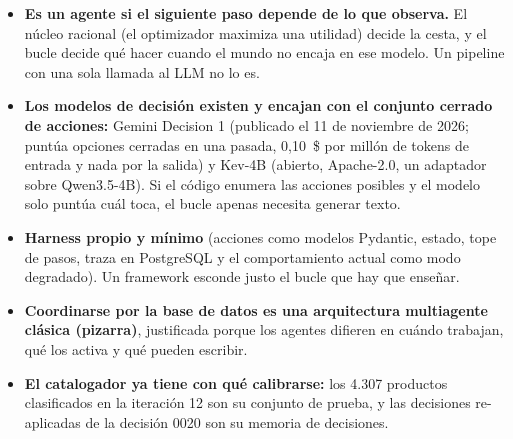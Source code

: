 \begin{tcolorbox}[colback=responsecolor, title=Insights de Claude, colframe=gray!60!black, breakable]
	\begin{itemize}
		\item \textbf{Es un agente si el siguiente paso depende de lo que observa.} El núcleo racional (el optimizador maximiza una utilidad) decide la cesta, y el bucle decide qué hacer cuando el mundo no encaja en ese modelo. Un pipeline con una sola llamada al LLM no lo es.

		\item \textbf{Los modelos de decisión existen y encajan con el conjunto cerrado de acciones:} Gemini Decision 1 (publicado el 11 de noviembre de 2026; puntúa opciones cerradas en una pasada, 0,10~\$ por millón de tokens de entrada y nada por la salida) y Kev-4B (abierto, Apache-2.0, un adaptador sobre Qwen3.5-4B). Si el código enumera las acciones posibles y el modelo solo puntúa cuál toca, el bucle apenas necesita generar texto.

		\item \textbf{Harness propio y mínimo} (acciones como modelos Pydantic, estado, tope de pasos, traza en PostgreSQL y el comportamiento actual como modo degradado). Un framework esconde justo el bucle que hay que enseñar.

		\item \textbf{Coordinarse por la base de datos es una arquitectura multiagente clásica (pizarra)}, justificada porque los agentes difieren en cuándo trabajan, qué los activa y qué pueden escribir.

		\item \textbf{El catalogador ya tiene con qué calibrarse:} los 4.307 productos clasificados en la iteración 12 son su conjunto de prueba, y las decisiones re-aplicadas de la decisión 0020 son su memoria de decisiones.
	\end{itemize}
\end{tcolorbox}

